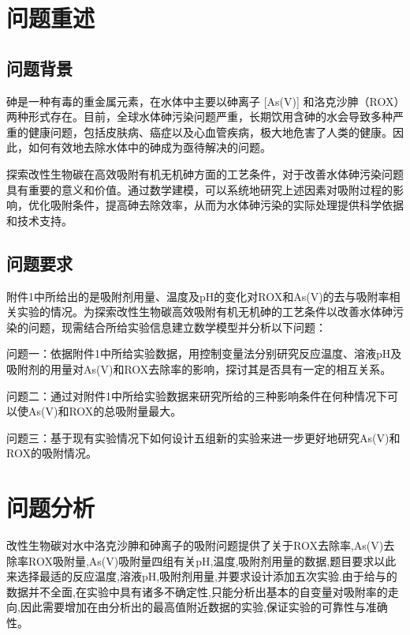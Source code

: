\documentclass[AutoFakeBold]{ctexart}
\begin{document}
	
	
	\setcounter{page}{2}
	\section{问题重述}
	\subsection{问题背景}
	\songti{}砷是一种有毒的重金属元素，在水体中主要以砷离子 [As(V)] 和洛克沙胂（ROX）两种形式存在。目前，全球水体砷污染问题严重，长期饮用含砷的水会导致多种严重的健康问题，包括皮肤病、癌症以及心血管疾病，极大地危害了人类的健康。因此，如何有效地去除水体中的砷成为亟待解决的问题。
	
	\songti{}探索改性生物碳在高效吸附有机无机砷方面的工艺条件，对于改善水体砷污染问题具有重要的意义和价值。通过数学建模，可以系统地研究上述因素对吸附过程的影响，优化吸附条件，提高砷去除效率，从而为水体砷污染的实际处理提供科学依据和技术支持。
	\subsection{问题要求}
	\songti{}附件1中所给出的是吸附剂用量、温度及pH的变化对ROX和As(V)的去与吸附率相关实验的情况。为探索改性生物碳高效吸附有机无机砷的工艺条件以改善水体砷污染的问题，现需结合所给实验信息建立数学模型并分析以下问题：
	
	\songti{}问题一：依据附件1中所给实验数据，用控制变量法分别研究反应温度、溶液pH及吸附剂的用量对As(V)和ROX去除率的影响，探讨其是否具有一定的相互关系。
	
	\songti{}问题二：通过对附件1中所给实验数据来研究所给的三种影响条件在何种情况下可以使As(V)和ROX的总吸附量最大。

	\songti{}问题三：基于现有实验情况下如何设计五组新的实验来进一步更好地研究As(V)和ROX的吸附情况。
	
	

	
	\section{问题分析}
	\songti{}改性生物碳对水中洛克沙胂和砷离子的吸附问题提供了关于ROX去除率,As(V)去除率ROX吸附量,As(V)吸附量四组有关pH,温度,吸附剂用量的数据,题目要求以此来选择最适的反应温度,溶液pH,吸附剂用量,并要求设计添加五次实验.由于给与的数据并不全面,在实验中具有诸多不确定性,只能分析出基本的自变量对吸附率的走向,因此需要增加在由分析出的最高值附近数据的实验,保证实验的可靠性与准确性。
\end{document}
